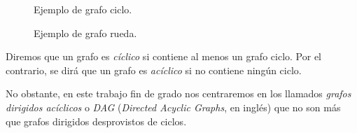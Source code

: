 \begin{figure}[H]
  \centering
\begin{minipage}[t]{0.45\linewidth}
\centering
{}
\caption{Ejemplo de grafo ciclo.}
	\label{fig:grafo6}
\end{minipage}
\hspace{0.5cm}
\begin{minipage}[t]{0.45\linewidth}
\centering
\caption{Ejemplo de grafo rueda.}
\label{fig:grafo7}
\end{minipage}
\end{figure}

\begin{definition}\label{def:cyclic}
Diremos que un grafo es \emph{cíclico} si contiene al menos un grafo ciclo. Por el contrario, se dirá que un grafo es \emph{acíclico} si no contiene ningún ciclo.

No obstante, en este trabajo fin de grado nos centraremos en los llamados \emph{grafos dirigidos acíclicos} o \emph{DAG} (\emph{Directed Acyclic Graphs}, en inglés) que no son más que grafos dirigidos desprovistos de ciclos.
\end{definition}

